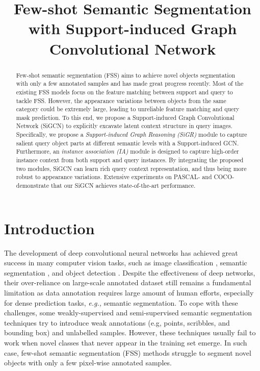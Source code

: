 \documentclass{bmvc2k}
\title{Few-shot Semantic Segmentation with Support-induced Graph Convolutional Network}
\begin{document}
\maketitle

\begin{abstract}
Few-shot semantic segmentation (FSS) aims to achieve novel objects segmentation with only a few annotated samples and has made great progress recently. 
Most of the existing FSS models focus on the feature matching between support and query to tackle FSS. 
However, the appearance variations between objects from the same category could be extremely large, leading to unreliable feature matching and query mask prediction.
To this end, we propose a Support-induced Graph Convolutional Network (SiGCN) to explicitly excavate latent context structure in query images.
Specifically, we propose a \emph{Support-induced Graph Reasoning (SiGR)} module to capture salient query object parts at different semantic levels with a Support-induced GCN. 
Furthermore, an \emph{instance association (IA)} module is designed to capture high-order instance context from both support and query instances.
By integrating the proposed two modules, SiGCN can learn rich query context representation, and thus being more robust to appearance variations. 
Extensive experiments on PASCAL- and COCO- demonstrate that our SiGCN achieves state-of-the-art performance.
\end{abstract} \section{Introduction}
The development of deep convolutional neural networks has achieved great success in many computer vision tasks, such as image classification \cite{he2016deep, simonyan2014very}, semantic segmentation \cite{zhao2017pyramid, yu2015multi, dai2017deformable, zhang2021k}, and object detection \cite{han2021query, girshick2015fast, he2017mask, redmon2018yolov3}. Despite the effectiveness of deep networks, their over-reliance on large-scale annotated dataset still remains a fundamental limitation as data annotation requires large amount of human efforts,  especially for dense prediction tasks, \textit{e.g.,} semantic segmentation. To cope with these challenges, some weakly-supervised and semi-supervised semantic segmentation techniques \cite{shimoda2019self, lee2021bbam, chen2021semi} try to introduce weak annotations (e.g, points, scribbles, and bounding box) and unlabelled samples. However, these techniques usually fail to work when novel classes that never appear in the training set emerge. In such case, few-shot semantic segmentation (FSS) methods \cite{wu2021learning, nguyen2019feature, rakelly2018conditional, siam2019amp, boudiaf2021few, zhang2021self, yang2021mining, zhang2021few,liu2020part, Li_2021_CVPR, xie2021scale, min2021hypercorrelation, tian2020prior, Zhang_2019_CVPR,wang2019panet} struggle to segment novel objects with only a few pixel-wise annotated samples.
\end{document}

